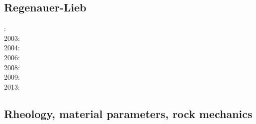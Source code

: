 \subsection*{Regenauer-Lieb}

: \cite{reyu00}\\
2003: \cite{reyu03}\\
2004: \cite{reyu04}\\
2006: \cite{rehy06}\cite{rewr06}\\
2008: \cite{rerw08}\\
2009: \cite{reps09}\\
2013: \cite{revp13}

\subsection*{Rheology, material parameters, rock mechanics}

